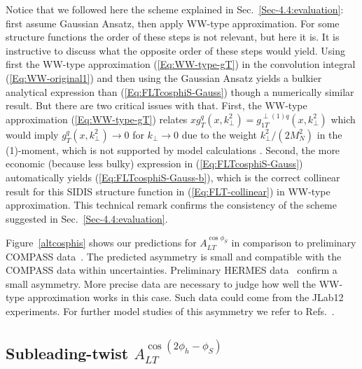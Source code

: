 \documentclass[a4paper,11pt]{article}
\def\kperp{k_\perp}
\begin{document}
Notice that we followed here the scheme explained in
Sec.~\ref{Sec-4.4:evaluation}: first assume Gaussian Ansatz, then apply
WW-type approximation. For some structure functions the order of
these steps is not relevant, but here it is. It is instructive to
discuss what the opposite order of these steps would yield.
Using first the WW-type approximation (\ref{Eq:WW-type-gT})
in the convolution integral (\ref{Eq:WW-original1}) and then
using the Gaussian Ansatz yields a bulkier
analytical expression than (\ref{Eq:FLTcosphiS-Gauss}) though
a numerically similar result. But there are two critical issues
with that. First, the WW-type approximation (\ref{Eq:WW-type-gT})
relates $xg^{q}_{T}(x,\kperp^2)=g^{\perp(1)q}_{1T}(x,\kperp^2)$ which
would imply $g^{q}_{T}(x, \kperp^2) \to 0$ for $\kperp\to0$
due to the weight $\kperp^2/(2M_N^2)$ in the (1)-moment,
which is not supported by model calculations \cite{Avakian:2010br}.
Second, the more economic (because
less bulky) expression in (\ref{Eq:FLTcosphiS-Gauss}) automatically
yields (\ref{Eq:FLTcosphiS-Gauss-b}), which is the correct collinear
result for this SIDIS structure function in (\ref{Eq:FLT-collinear})
in WW-type approximation. This technical remark confirms the
consistency of the scheme suggested in Sec.~\ref{Sec-4.4:evaluation}.

Figure~\ref{altcosphis} shows our predictions
for $A_{LT}^{\cos\phi_S}$ in comparison to preliminary
COMPASS data~\cite{Parsamyan:2013fia}. The predicted
asymmetry is small and compatible with the COMPASS data within
uncertainties.
Preliminary HERMES data~\cite{Pappalardo:2012zz} confirm a small asymmetry.
More precise data are necessary to judge how
well the WW-type approximation works in this case. Such data
could come from the JLab12 experiments.
For further model studies of this asymmetry we refer to
Refs.~\cite{Mao:2014fma,Wang:2016dti}.




\subsection{\boldmath Subleading-twist  $A_{LT}^{\cos(2\phi_h - \phi_S)}$}
\label{Sec-7.3:FLTcos2phi-phiS}
\end{document}

